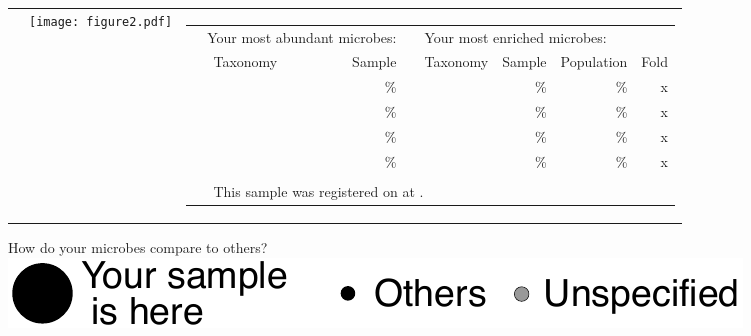 \documentclass[landscape]{article}
\begin{document}
\begin{tabular*}{\textwidth}{ m{0.3in} m{4.0in} m{7.5in} }
	&
	\vspace{2mm}
	\hspace{-5mm}
	\texttt{[image: figure2.pdf]}
	
    &
    {\normalsize 
    \vspace{2.5mm}
    \parbox[b][][t]{6.5in}{
	\begin{tabular}{ c l r c l r r r }
    \multicolumn{3}{l}{\large ~~Your most abundant microbes:} & \multicolumn{5}{l}{\large ~~Your most enriched microbes:}\\ \addlinespace[2mm]
        \cline{2-3} \cline{5-8} \addlinespace[1mm]
        & Taxonomy & Sample & & Taxonomy & Sample & Population & Fold \\
        \cline{2-3} \cline{5-8} \addlinespace[1mm]
        & \abundTaxonA{} & \abundSamplA{}\% & & \enrichTaxonA{} & \enrichSamplA{}\% & \enrichPopulA{}\% & \enrichFoldA{}x \\
        & \abundTaxonB{} & \abundSamplB{}\% & & \enrichTaxonB{} & \enrichSamplB{}\% & \enrichPopulB{}\% & \enrichFoldB{}x \\
        & \abundTaxonC{} & \abundSamplC{}\% & & \enrichTaxonC{} & \enrichSamplC{}\% & \enrichPopulC{}\% & \enrichFoldC{}x \\
        & \abundTaxonD{} & \abundSamplD{}\% & & \enrichTaxonD{} & \enrichSamplD{}\% & \enrichPopulD{}\% & \enrichFoldD{}x \\
        \cline{2-3} \cline{5-8} \addlinespace[3mm]
        & \multicolumn{7}{p{5.6in}}{\footnotesize \rareList{}} \\
        & \multicolumn{7}{p{5.6in}}{\footnotesize This sample was registered on \sampledate{} at \sampletime{}.}
	\end{tabular}
	}
	}
\end{tabular*}

\vspace{5mm}


{\huge How do your \sampletype{} microbes compare to others?} \hspace{1cm} \includegraphics[scale=0.45]{pdfs-gut/ball_legend.pdf}

\vspace{5mm}
\end{document}
